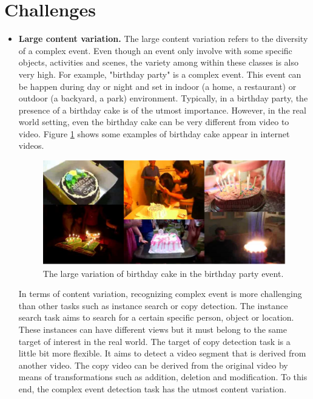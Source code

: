 \section{Challenges}
\label{c1_challenges}
\begin{itemize}
	\item{\textbf{Large content variation.}} The large content variation refers to the diversity of a complex event. Even though an event only involve with some specific objects, activities and scenes, the variety among within these classes is also very high. For example, "birthday party" is a complex event. This event can be happen during day or night and set in indoor (a home, a restaurant) or outdoor (a backyard, a park) environment. Typically, in a birthday party, the presence of a birthday cake is of the utmost importance. However, in the real world setting, even the birthday cake can be very different from video to video. Figure \ref{c1_largecontent} shows some examples of birthday cake appear in internet videos. 
	\begin{figure}
		\centering
		\includegraphics[width=1\textwidth]{largecontent.pdf}
		\caption{The large variation of birthday cake in the birthday party event.}
		\label{c1_largecontent}
	\end{figure}
	
	In terms of content variation, recognizing complex event is more challenging than other tasks such as instance search or copy detection. The instance search task aims to search for a certain specific person, object or location. These instances can have different views but it must belong to the same target of interest in the real world. The target of copy detection task is a little bit more flexible. It aims to detect a video segment that is derived from another video. The copy video can be derived from the original video by means of transformations such as addition, deletion and modification. To this end, the complex event detection task has the utmost content variation.
	 

\end{itemize}
